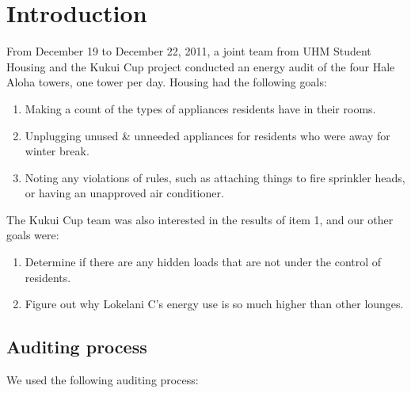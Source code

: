 \documentclass[11pt,draft]{article}
\begin{document}
\section{Introduction}

From December 19 to December 22, 2011, a joint team from UHM Student Housing and the Kukui Cup project conducted an energy audit of the four Hale Aloha towers, one tower per day. Housing had the following goals:

\begin{enumerate}
\item Making a count of the types of appliances residents have in their rooms.
\item Unplugging unused \& unneeded appliances for residents who were away for winter break.
\item Noting any violations of rules, such as attaching things to fire sprinkler heads, or having an unapproved air conditioner.
\end{enumerate}

The Kukui Cup team was also interested in the results of item 1, and our other goals were:

\begin{enumerate}[resume]
\item Determine if there are any hidden loads that are not under the control of residents.
\item Figure out why Lokelani C's energy use is so much higher than other lounges.
\end{enumerate}

\subsection{Auditing process}

We used the following auditing process:
\end{document}
